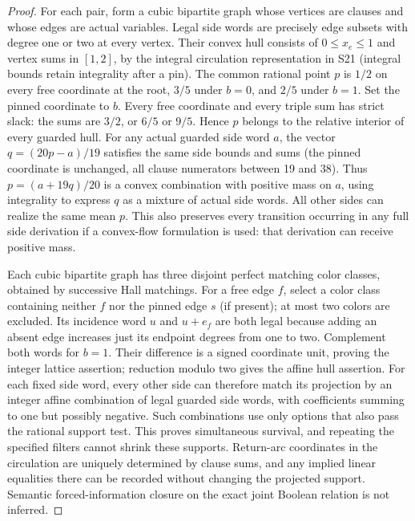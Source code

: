 \documentclass[11pt]{article}
\begin{document}
\begin{proof}
For each pair, form a cubic bipartite graph whose vertices are clauses and whose edges are actual variables. Legal side words are precisely edge subsets with degree one or two at every vertex. Their convex hull consists of $0\le x_e\le1$ and vertex sums in $[1,2]$, by the integral circulation representation in S21 (integral bounds retain integrality after a pin). The common rational point $p$ is $1/2$ on every free coordinate at the root, $3/5$ under $b=0$, and $2/5$ under $b=1$. Set the pinned coordinate to $b$. Every free coordinate and every triple sum has strict slack: the sums are $3/2$, or $6/5$ or $9/5$. Hence $p$ belongs to the relative interior of every guarded hull. For any actual guarded side word $a$, the vector $q=(20p-a)/19$ satisfies the same side bounds and sums (the pinned coordinate is unchanged, all clause numerators between 19 and 38). Thus $p=(a+19q)/20$ is a convex combination with positive mass on $a$, using integrality to express $q$ as a mixture of actual side words. All other sides can realize the same mean $p$. This also preserves every transition occurring in any full side derivation if a convex-flow formulation is used: that derivation can receive positive mass.

Each cubic bipartite graph has three disjoint perfect matching color classes, obtained by successive Hall matchings. For a free edge $f$, select a color class containing neither $f$ nor the pinned edge $s$ (if present); at most two colors are excluded. Its incidence word $u$ and $u+e_f$ are both legal because adding an absent edge increases just its endpoint degrees from one to two. Complement both words for $b=1$. Their difference is a signed coordinate unit, proving the integer lattice assertion; reduction modulo two gives the affine hull assertion. For each fixed side word, every other side can therefore match its projection by an integer affine combination of legal guarded side words, with coefficients summing to one but possibly negative. Such combinations use only options that also pass the rational support test. This proves simultaneous survival, and repeating the specified filters cannot shrink these supports. Return-arc coordinates in the circulation are uniquely determined by clause sums, and any implied linear equalities there can be recorded without changing the projected support. Semantic forced-information closure on the exact joint Boolean relation is not inferred.
\end{proof}
\end{document}
